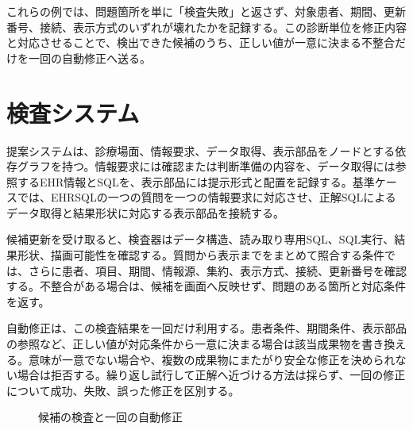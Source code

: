 \documentclass[a4paper]{jsarticle}
\begin{document}
これらの例では、問題箇所を単に「検査失敗」と返さず、対象患者、期間、更新番号、接続、表示方式のいずれが壊れたかを記録する。この診断単位を修正内容と対応させることで、検出できた候補のうち、正しい値が一意に決まる不整合だけを一回の自動修正へ送る。

\section{検査システム}

提案システムは、診療場面、情報要求、データ取得、表示部品をノードとする依存グラフを持つ。情報要求には確認または判断準備の内容を、データ取得には参照するEHR情報とSQLを、表示部品には提示形式と配置を記録する。基準ケースでは、EHRSQLの一つの質問を一つの情報要求に対応させ、正解SQLによるデータ取得と結果形状に対応する表示部品を接続する。

候補更新を受け取ると、検査器はデータ構造、読み取り専用SQL、SQL実行、結果形状、描画可能性を確認する。質問から表示までをまとめて照合する条件では、さらに患者、項目、期間、情報源、集約、表示方式、接続、更新番号を確認する。不整合がある場合は、候補を画面へ反映せず、問題のある箇所と対応条件を返す。

自動修正は、この検査結果を一回だけ利用する。患者条件、期間条件、表示部品の参照など、正しい値が対応条件から一意に決まる場合は該当成果物を書き換える。意味が一意でない場合や、複数の成果物にまたがり安全な修正を決められない場合は拒否する。繰り返し試行して正解へ近づける方法は採らず、一回の修正について成功、失敗、誤った修正を区別する。

\begin{figure}[t]
  \centering
  \caption{候補の検査と一回の自動修正}
  \label{fig:validation}
\end{figure}
\end{document}
